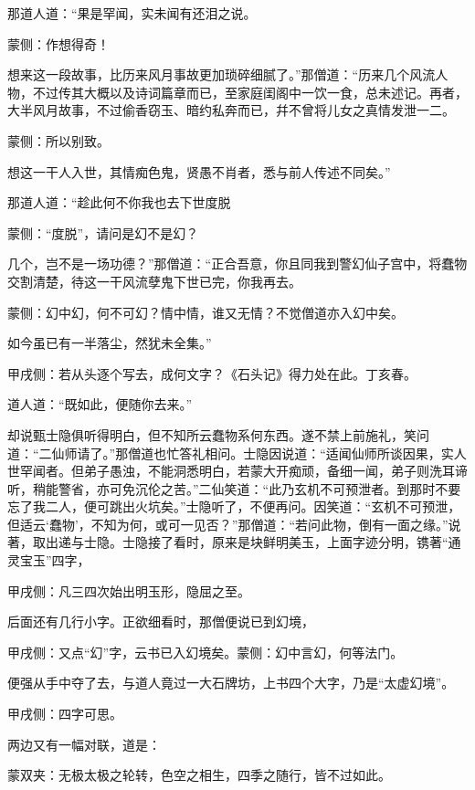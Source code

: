 \begin{parag}
    那道人道：“果是罕闻，实未闻有还泪之说。\begin{note}蒙侧：作想得奇！\end{note}想来这一段故事，比历来风月事故更加琐碎细腻了。”那僧道：“历来几个风流人物，不过传其大概以及诗词篇章而已，至家庭闺阁中一饮一食，总未述记。再者，大半风月故事，不过偷香窃玉、暗约私奔而已，幷不曾将儿女之真情发泄一二。\begin{note}蒙侧：所以别致。\end{note}想这一干人入世，其情痴色鬼，贤愚不肖者，悉与前人传述不同矣。”
\end{parag}


\begin{parag}
    那道人道：“趁此何不你我也去下世度脱\begin{note}蒙侧：“度脱”，请问是幻不是幻？\end{note}几个，岂不是一场功德？”那僧道：“正合吾意，你且同我到警幻仙子宫中，将蠢物交割清楚，待这一干风流孽鬼下世已完，你我再去。\begin{note}蒙侧：幻中幻，何不可幻？情中情，谁又无情？不觉僧道亦入幻中矣。\end{note}如今虽已有一半落尘，然犹未全集。”\begin{note}甲戌侧：若从头逐个写去，成何文字？《石头记》得力处在此。丁亥春。\end{note}
\end{parag}


\begin{parag}
    道人道：“既如此，便随你去来。”
\end{parag}


\begin{parag}
    却说甄士隐俱听得明白，但不知所云蠢物系何东西。遂不禁上前施礼，笑问道：“二仙师请了。”那僧道也忙答礼相问。士隐因说道：“适闻仙师所谈因果，实人世罕闻者。但弟子愚浊，不能洞悉明白，若蒙大开痴顽，备细一闻，弟子则洗耳谛听，稍能警省，亦可免沉伦之苦。”二仙笑道：“此乃玄机不可预泄者。到那时不要忘了我二人，便可跳出火坑矣。”士隐听了，不便再问。因笑道：“玄机不可预泄，但适云‘蠢物’，不知为何，或可一见否？”那僧道：“若问此物，倒有一面之缘。”说著，取出递与士隐。士隐接了看时，原来是块鲜明美玉，上面字迹分明，镌著“通灵宝玉”四字，\begin{note}甲戌侧：凡三四次始出明玉形，隐屈之至。\end{note}后面还有几行小字。正欲细看时，那僧便说已到幻境，\begin{note}甲戌侧：又点“幻”字，云书已入幻境矣。蒙侧：幻中言幻，何等法门。\end{note}便强从手中夺了去，与道人竟过一大石牌坊，上书四个大字，乃是“太虚幻境”。\begin{note}甲戌侧：四字可思。\end{note}两边又有一幅对联，道是：\begin{note}蒙双夹：无极太极之轮转，色空之相生，四季之随行，皆不过如此。\end{note}
\end{parag}


